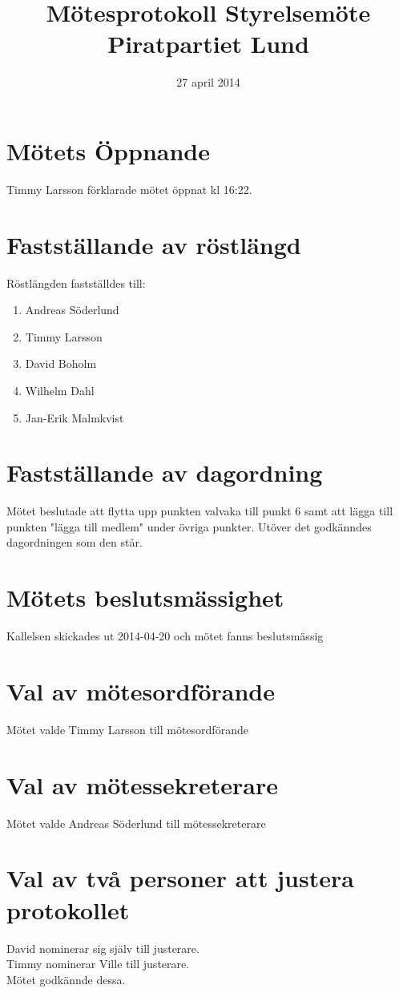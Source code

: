 \documentclass[a4paper,10pt]{article}
\title{\vspace{-1.5in}\textmd{\textbf{Mötesprotokoll Styrelsemöte Piratpartiet Lund}}}
\date{27 april 2014}
\author{}
\begin{document}
\maketitle

\section{Mötets Öppnande}
Timmy Larsson förklarade mötet öppnat kl 16:22.

\section{Fastställande av röstlängd}
Röstlängden fastställdes till:
\begin{enumerate}
\item Andreas Söderlund
\item Timmy Larsson
\item David Boholm
\item Wilhelm Dahl
\item Jan-Erik Malmkvist
\end{enumerate}

\section{Fastställande av dagordning}
Mötet beslutade att flytta upp punkten valvaka till punkt 6 samt att lägga till punkten "lägga till medlem" under övriga punkter. Utöver det godkänndes dagordningen som den står.

\section{Mötets beslutsmässighet}
Kallelsen skickades ut 2014-04-20 och mötet fanns beslutsmässig

\newpage

\section{Val av mötesordförande}
Mötet valde Timmy Larsson till mötesordförande

\section{Val av mötessekreterare}
Mötet valde Andreas Söderlund till mötessekreterare

\section{Val av två personer att justera protokollet}
David nominerar sig själv till justerare.\\
Timmy nominerar Ville till justerare.\\
Mötet godkännde dessa.
\end{document}
